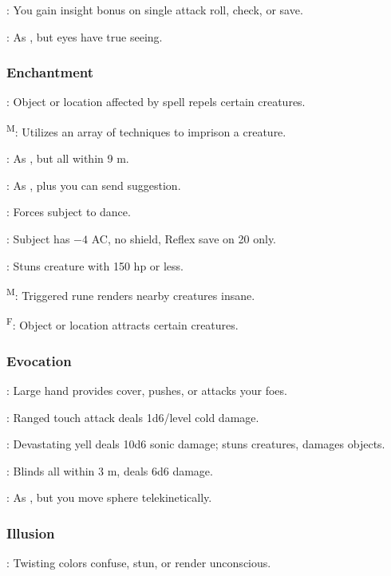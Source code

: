	: You gain insight bonus on single attack roll, check, or save.

	: As , but eyes have true seeing.

\subsubsection{Enchantment}
	: Object or location affected by spell repels certain creatures.

	\textsuperscript{M}: Utilizes an array of techniques to imprison a creature.

	: As , but all within 9 m.

	: As , plus you can send suggestion.

	: Forces subject to dance.

	: Subject has $-4$ AC, no shield, Reflex save on 20 only.

	: Stuns creature with 150 hp or less.

	\textsuperscript{M}: Triggered rune renders nearby creatures insane.

	\textsuperscript{F}: Object or location attracts certain creatures.

\subsubsection{Evocation}
	: Large hand provides cover, pushes, or attacks your foes.

	: Ranged touch attack deals 1d6/level cold damage.

	: Devastating yell deals 10d6 sonic damage; stuns creatures, damages objects.

	: Blinds all within 3 m, deals 6d6 damage.

	: As , but you move sphere telekinetically.

\subsubsection{Illusion}
	: Twisting colors confuse, stun, or render unconscious.

